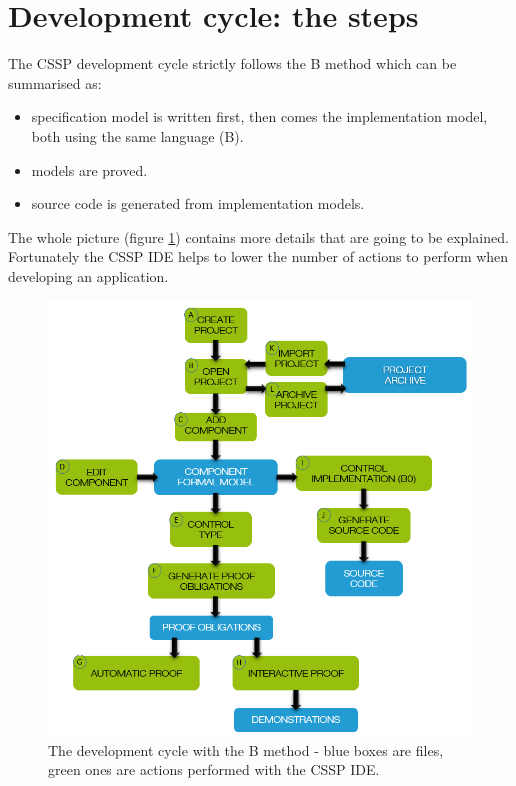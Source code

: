 \section{Development cycle: the steps}

The CSSP development cycle strictly follows the B method which can be summarised as:
\begin{itemize}
    \item specification model is written first, then comes the implementation model, both using the same language (B).
    \item models are proved.
    \item source code is generated from implementation models.
\end{itemize}
The whole picture (figure \ref{programming:b-method}) contains more details that are going to be explained. Fortunately the CSSP IDE helps to lower the number of actions to perform when developing an application.
  \begin{figure}[ht]
\centering\includegraphics[scale=0.4]{Pictures/chapterProgramming/b-method.png}
\caption{The development cycle with the B method - blue boxes are files, green ones are actions performed with the CSSP IDE.}
\label{programming:b-method}
\end{figure}  

